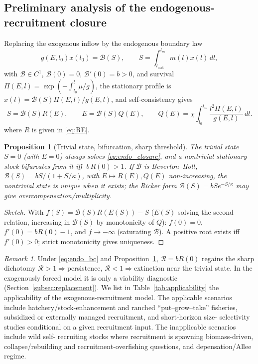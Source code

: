 \documentclass[pdflatex,sn-mathphys-num]{sn-jnl}
\newcommand{\R}{\mathcal{R}}
\newcommand{\B}{\mathcal{B}}
\theoremstyle{thmstyleone}
\newtheorem{proposition}[theorem]{Proposition}
\theoremstyle{definition}
\theoremstyle{remark}
\newtheorem{remark}[theorem]{Remark}
\begin{document}
\subsection{Preliminary analysis of the endogenous-recruitment closure}\label{subsec:endo}
Replacing the exogenous inflow by the endogenous boundary law
\begin{equation}\label{eq:endo_bc}
g(E,l_0)x(l_0)=\B(S),\qquad S=\int_{l_{\mathrm{mat}}}^{l_m}m(l)x(l)\,dl,
\end{equation}
with $\B\in C^1$, $\B(0)=0$, $\B'(0)=b>0$, and survival
$\Pi(E,l)=\exp(-\int_{l_0}^l\mu/g)$, the stationary profile is
$x(l)=\B(S)\Pi(E,l)/g(E,l)$, and self-consistency gives
\begin{equation}\label{eq:endo_closure}
S=\B(S)R(E),\qquad E=\B(S)Q(E),\qquad
Q(E)=\chi\!\int_{l_0}^{l_m}\frac{l^2\Pi(E,l)}{g(E,l)}\,dl .
\end{equation}
where $R$ is given in \eqref{eq:RE}.
\begin{proposition}[Trivial state, bifurcation, sharp threshold]\label{prop:endo}
The trivial state $S=0$ (with $E=0$) always solves \eqref{eq:endo_closure}, and a
nontrivial stationary stock bifurcates from it iff $\ b\,R(0)>1$. If $\B$ is
Beverton--Holt, $\B(S)=bS/(1+S/\kappa)$, with $E\mapsto R(E),Q(E)$ non-increasing,
the nontrivial state is unique when it exists; the Ricker form
$\B(S)=bSe^{-S/\kappa}$ may give overcompensation/multiplicity.
\end{proposition}
\begin{proof}[Sketch]
With $f(S)=\B(S)R(E(S))-S$ ($E(S)$ solving the second relation, increasing in
$\B(S)$ by monotonicity of $Q$): $f(0)=0$, $f'(0)=bR(0)-1$, and $f\to-\infty$
(saturating $\B$). A positive root exists iff $f'(0)>0$; strict monotonicity gives
uniqueness.
\end{proof}
\begin{remark}
Under \eqref{eq:endo_bc} and Proposition~\ref{prop:endo}, $\R=b R(0)$ regains the sharp dichotomy
$\R>1\Rightarrow$persistence, $\R<1\Rightarrow$extinction near the trivial state.
In the exogenously forced model it is only a viability diagnostic
(Section~\ref{subsec:replacement}). We list in Table~\ref{tab:applicability} the applicability of the exogenous-recruitment model. The applicable scenarios include hatchery/stock-enhancement and ranched
“put–grow–take” fisheries, subsidized or externally managed recruitment, and short-horizon size-
selectivity studies conditional on a given recruitment input. The inapplicable scenarios include wild self-
recruiting stocks where recruitment is spawning biomass-driven, collapse/rebuilding and recruitment-overfishing questions, and depensation/Allee regime.
\end{remark}
\end{document}
